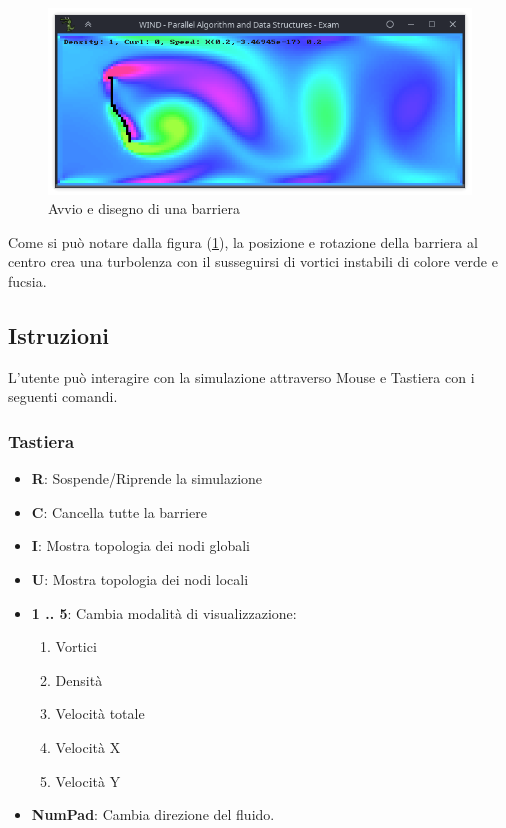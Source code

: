 \documentclass[12pt]{article}
\begin{document}
\newpage
\begin{figure}
    \centering
    \includegraphics[scale=0.75]{5}
    \caption{Avvio e disegno di una barriera}
    \label{fig:startup}
\end{figure}



Come si può notare dalla figura (\ref{fig:startup}), la posizione e rotazione della barriera al centro crea una turbolenza con il susseguirsi di vortici instabili di colore verde e fucsia.



\subsection{Istruzioni}
L'utente può interagire con la simulazione attraverso Mouse e Tastiera con i seguenti comandi.

\subsubsection{Tastiera}
\begin{itemize}
    \item \textbf{R}: Sospende/Riprende la simulazione
    \item \textbf{C}: Cancella tutte la barriere
    \item \textbf{I}: Mostra topologia dei nodi globali
    \item \textbf{U}: Mostra topologia dei nodi locali
    \item \textbf{1 .. 5}: Cambia modalità di visualizzazione: 
        \begin{enumerate}
            \item Vortici
            \item Densità
            \item Velocità totale
            \item Velocità X
            \item Velocità Y
        \end{enumerate}
    \item \textbf{NumPad}: Cambia direzione del fluido.
\end{itemize}
\end{document}
